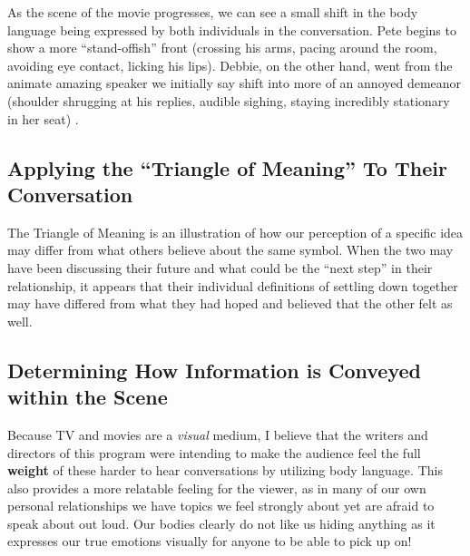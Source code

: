 \documentclass[stu,12pt]{apa7}
\begin{document}
      As the scene of the movie progresses, we can see a small shift in the
        body language being expressed by both individuals in the conversation.
        Pete begins to show a more ``stand-offish'' front (crossing his arms,
        pacing around the room, avoiding eye contact, licking his lips). Debbie,
        on the other hand, went from the animate amazing speaker we initially
        say shift into more of an annoyed demeanor (shoulder shrugging at his
        replies, audible sighing, staying incredibly stationary in her seat)
        \parencite{apatow_this_2012}.

    \subsection{Applying the ``Triangle of Meaning'' To Their Conversation}
      The Triangle of Meaning is an illustration of how our perception of a
        specific idea may differ from what others believe about the
        same symbol. When the two may have been discussing their future and
        what could be the ``next step'' in their relationship, it appears that
        their individual definitions of settling down together may have differed
        from what they had hoped and believed that the other felt as well.

    \subsection{Determining How Information is Conveyed within the Scene}
      Because TV and movies are a \textit{visual} medium, I believe that the
        writers and directors of this program were intending to make the
        audience feel the full \textbf{weight} of these harder to hear
        conversations by utilizing body language. This also provides a more
        relatable feeling for the viewer, as in many of our own personal
        relationships we have topics we feel strongly about yet are afraid to
        speak about out loud. Our bodies clearly do not like us hiding anything
        as it expresses our true emotions visually for anyone to be able to
        pick up on!


  \newpage
  \printbibliography[%
    title={References},%
    heading={bibintoc},%
    notcategory={consulted}%
  ]


  \newpage
  \nocite{*}
  \printbibliography[%
    title={Additional References},%
    heading={bibintoc},%
    category={consulted}%
  ]
\end{document}
